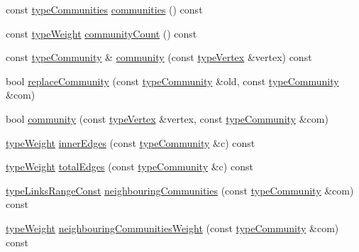 \begin{DoxyCompactItemize}
const \hyperlink{graphUndirectedGroupable_8h_ab79c7252155ca17cb49aa0b1fea30116}{type\+Communities} \hyperlink{classGraphUndirectedGroupable_a57f8ea4cff0d83b80cca2dc8e8e19ff6}{communities} () const
\item 
const \hyperlink{edge_8h_a2e7ea3be891ac8b52f749ec73fee6dd2}{type\+Weight} \hyperlink{classGraphUndirectedGroupable_adf6ebb83c3df6317f122a13650309ac4}{community\+Count} () const
\item 
const \hyperlink{graphUndirectedGroupable_8h_a914da95c9ea7f14f4b7f875c36818556}{type\+Community} \& \hyperlink{classGraphUndirectedGroupable_ad40474d566b3f9fbe9d132fbbe562ed5}{community} (const \hyperlink{edge_8h_a5fbd20c46956d479cb10afc9855223f6}{type\+Vertex} \&vertex) const
\item 
bool \hyperlink{classGraphUndirectedGroupable_af29e653d9578b955e47288e075ebf47f}{replace\+Community} (const \hyperlink{graphUndirectedGroupable_8h_a914da95c9ea7f14f4b7f875c36818556}{type\+Community} \&old, const \hyperlink{graphUndirectedGroupable_8h_a914da95c9ea7f14f4b7f875c36818556}{type\+Community} \&com)
\item 
bool \hyperlink{classGraphUndirectedGroupable_a7a9642a50ac522d9020afb9df211702f}{community} (const \hyperlink{edge_8h_a5fbd20c46956d479cb10afc9855223f6}{type\+Vertex} \&vertex, const \hyperlink{graphUndirectedGroupable_8h_a914da95c9ea7f14f4b7f875c36818556}{type\+Community} \&com)
\item 
\hyperlink{edge_8h_a2e7ea3be891ac8b52f749ec73fee6dd2}{type\+Weight} \hyperlink{classGraphUndirectedGroupable_a1986c140fd9aba8063774372c971706d}{inner\+Edges} (const \hyperlink{graphUndirectedGroupable_8h_a914da95c9ea7f14f4b7f875c36818556}{type\+Community} \&c) const
\item 
\hyperlink{edge_8h_a2e7ea3be891ac8b52f749ec73fee6dd2}{type\+Weight} \hyperlink{classGraphUndirectedGroupable_a8aa795a6e0ae115d35937508c5aad401}{total\+Edges} (const \hyperlink{graphUndirectedGroupable_8h_a914da95c9ea7f14f4b7f875c36818556}{type\+Community} \&c) const
\item 
\hyperlink{graphInterface_8h_ae8d27008f15586bbf419af7ad2e0a48a}{type\+Links\+Range\+Const} \hyperlink{classGraphUndirectedGroupable_a48823a0162b95a72c22d0ab01a709e1f}{neighbouring\+Communities} (const \hyperlink{graphUndirectedGroupable_8h_a914da95c9ea7f14f4b7f875c36818556}{type\+Community} \&com) const
\item 
\hyperlink{edge_8h_a2e7ea3be891ac8b52f749ec73fee6dd2}{type\+Weight} \hyperlink{classGraphUndirectedGroupable_ae8d5d8cea2c1dfba0b4e7110100f2973}{neighbouring\+Communities\+Weight} (const \hyperlink{graphUndirectedGroupable_8h_a914da95c9ea7f14f4b7f875c36818556}{type\+Community} \&com) const

\end{DoxyCompactItemize}
